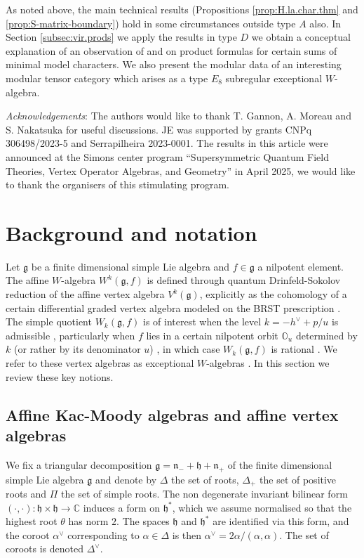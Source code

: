 \documentclass[12pt]{amsart}
\theoremstyle{plain}
\theoremstyle{definition}
\numberwithin{equation}{section}
\newcommand{\al}{\alpha}
\newcommand{\D}{\Delta}
\newcommand{\C}{\mathbb{C}}
\newcommand{\g}{\mathfrak{g}}
\newcommand{\h}{\mathfrak{h}}
\newcommand{\n}{\mathfrak{n}}
\newcommand{\mbo}{\mathbb{O}}
\begin{document}
As noted above, the main technical results (Propositions \ref{prop:H.la.char.thm} and \ref{prop:S-matrix-boundary}) hold in some circumstances outside type $A$ also. In Section \ref{subsec:vir.prods} we apply the results in type $D$ we obtain a conceptual explanation of an observation of \cite{BF2000} and \cite{FFW} on product formulas for certain sums of minimal model characters. We also present the modular data of an interesting modular tensor category which arises as a type $E_8$ subregular exceptional $W$-algebra.

\emph{Acknowledgements}: The authors would like to thank T. Gannon, A. Moreau and S. Nakatsuka for useful discussions. JE was supported by grants CNPq 306498/2023-5 and Serrapilheira 2023-0001. The results in this article were announced at the Simons center program ``Supersymmetric Quantum Field Theories, Vertex Operator Algebras, and Geometry'' in April 2025, we would like to thank the organisers of this stimulating program.



\section{Background and notation}\label{sec:background}

Let $\g$ be a finite dimensional simple Lie algebra and $f \in \g$ a nilpotent element. The affine $W$-algebra $W^k(\g, f)$ is defined through quantum Drinfeld-Sokolov reduction of the affine vertex algebra $V^k(\g)$, explicitly as the cohomology of a certain differential graded vertex algebra modeled on the BRST prescription \cite{FF, KRW03}. The simple quotient $W_k(\g, f)$ is of interest when the level $k = -h^\vee + p/u$ is admissible \cite{KW88}, particularly when $f$ lies in a certain nilpotent orbit $\mbo_u$ determined by $k$ (or rather by its denominator $u$) \cite{Arakawa2015}, in which case $W_k(\g, f)$ is rational \cite{McRae2021}. We refer to these vertex algebras as exceptional $W$-algebras \cite{KW2009, AE2023}. In this section we review these key notions.



\subsection{Affine Kac-Moody algebras and affine vertex algebras}

We fix a triangular decomposition $\g = \n_- + \h + \n_+$ of the finite dimensional simple Lie algebra $\g$ and denote by $\D$ the set of roots, $\D_+$ the set of positive roots and $\Pi$ the set of simple roots. The non degenerate invariant bilinear form $(\cdot, \cdot) : \h \times \h \rightarrow \C$ induces a form on $\h^*$, which we assume normalised so that the highest root $\theta$ has norm $2$. The spaces $\h$ and $\h^*$ are identified via this form, and the coroot $\al^\vee$ corresponding to $\al \in \D$ is then $\al^\vee = 2\al / (\al, \al)$. The set of coroots is denoted $\D^\vee$.
\end{document}
